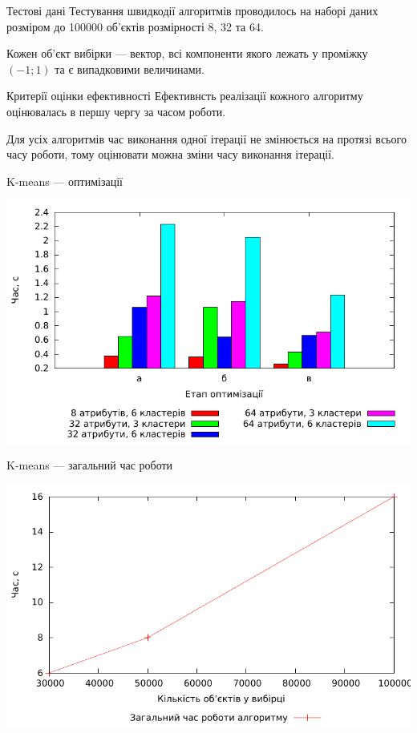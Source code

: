\documentclass{beamer}
\begin{document}
    
    \begin{frame}{Тестові дані}
        Тестування швидкодії алгоритмів проводилось на наборі даних розміром до 100000 об’єктів розмірності 8, 32 та 64.
        
        Кожен об’єкт вибірки --- вектор, всі компоненти якого лежать у проміжку $(-1; 1)$ та є випадковими величинами.
    \end{frame}
    
    
    \begin{frame}{Критерії оцінки ефективності}
        Ефективнсть реалізації кожного алгоритму оцінювалась в першу чергу за часом роботи.
        
        Для усіх алгоритмів час виконання одної ітерації не змінюється на протязі всього часу роботи, тому оцінювати можна зміни часу виконання ітерації.
    \end{frame}
    
    
    \begin{frame}{K-means --- оптимізації}
        \begin{center}
            \includegraphics[scale=0.8]{kmeans_iteration_average.pdf}
        \end{center}
    \end{frame}
    
    
    \begin{frame}{K-means --- загальний час роботи}
        \begin{center}
            \includegraphics[scale=0.8]{kmeans_complexity.pdf}
        \end{center}
    \end{frame}
    
\end{document}
